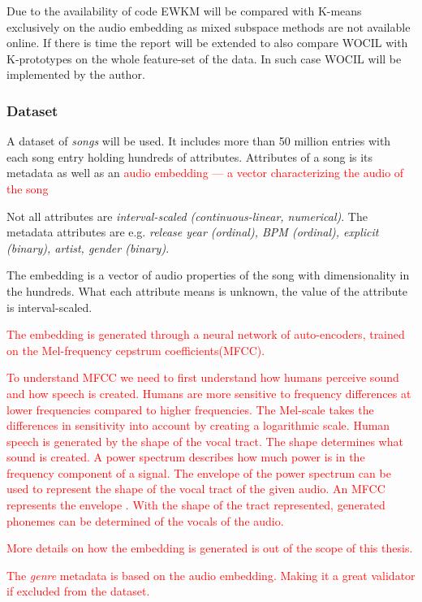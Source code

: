 \documentclass[a4paper,11pt]{article}
\begin{document}
Due to the availability of code EWKM will be compared with K-means exclusively on the audio embedding as mixed subspace methods are not available online. If there is time the report will be extended to also compare WOCIL with K-prototypes on the whole feature-set of the data. In such case WOCIL will be implemented by the author.


\subsubsection{Dataset}

A dataset of \textit{songs} will be used. It includes more than 50 million
entries with each song entry holding hundreds of attributes. Attributes
of a song is its metadata as well as an \textcolor{red}{audio embedding --- a vector characterizing the audio of the song}


Not all attributes are \textit{interval-scaled (continuous-linear, numerical)}. The metadata
attributes are e.g. \textit{release year (ordinal), BPM (ordinal),
explicit (binary), artist, gender (binary)}. 

The embedding is a vector of
audio properties of the song with dimensionality in the hundreds. What
each attribute means is unknown, the value of the attribute is
interval-scaled.

\textcolor{red}{
  The embedding is generated through a neural network of auto-encoders, trained on the Mel-frequency cepstrum coefficients(MFCC)\cite{Paliwal2010}.
}

\textcolor{red}{
To understand MFCC we need to first understand how humans perceive sound and how speech is created. Humans are more sensitive to frequency differences at lower frequencies compared to higher frequencies. The Mel-scale takes the differences in sensitivity into account by creating a logarithmic scale. Human speech is generated by the shape of the vocal tract. The shape determines what sound is created.
A power spectrum describes how much power is in the frequency component of a signal. The envelope of the power spectrum can be used to represent the shape of the vocal tract of the given audio. An MFCC represents the envelope \cite{Paliwal2010}. With the shape of the tract represented, generated phonemes can be determined of the vocals of the audio.
}

\textcolor{red}{
More details on how the embedding is generated is out of the scope of this thesis. 
}


\textcolor{red}{
The \textit{genre} metadata is based on the audio embedding. Making it a great validator if excluded from the dataset.
}
\end{document}
